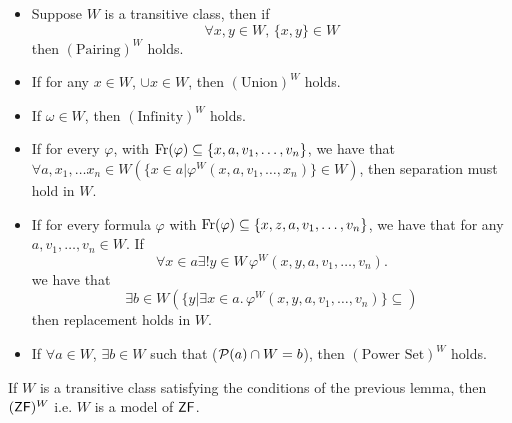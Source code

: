 \documentclass{article}
\begin{document}
\begin{fancylem}{}\hspace{0.1cm}
    \begin{itemize}
        \item Suppose $W$ is a transitive class, then if \[ \forall x,y \in W, \, \{x,y\} \in W\] then $(\text{Pairing})^{W}$ holds.
        \item If for any $x \in W$, $\cup x \in W$, then $(\text{Union})^{W}$ holds.
        \item If $\omega \in W$, then $(\text{Infinity})^{W}$ holds.
        \item If for every $\varphi$, with $\operatorname{Fr}(\varphi) \subseteq \{x,a, v_{1}, \dots, v_{n}\}$, we have that $\forall a,x_{1}, \dots x_{n} \in W (\{ x \in a | \varphi^{W}(x,a,v_{1}, \dots, x_{n}) \} \in W)$, then separation must hold in $W$.
        \item If for every formula $\varphi$ with $\operatorname{Fr}(\varphi) \subseteq \{x,z,a,v_{1}, \dots, v_{n}\}$, we have that for any $a,v_{1},\dots, v_{n} \in W$. If \[\forall x \in a \exists ! y \in W\,  \varphi^{W}(x,y,a,v_{1}, \dots, v_{n}).\] we have that \[ \exists b \in W \left( \{ y | \exists x \in a. \, \varphi^{W}(x,y,a,v_{1},\dots,v_{n})\} \subseteq \right)\] then replacement holds in $W$.
        \item If $\forall a \in W$, $\exists b \in W$ such that ($\mathcal{P}(a) \cap W = b$), then $(\text{Power Set})^{W}$ holds.
    \end{itemize}
\end{fancylem}
\begin{corr}{}
    If $W$ is a transitive class satisfying the conditions of the previous lemma, then $(\mathsf{ZF})^{W}$ i.e. $W$ is a model of $\mathsf{ZF}$.
\end{corr}
\end{document}
